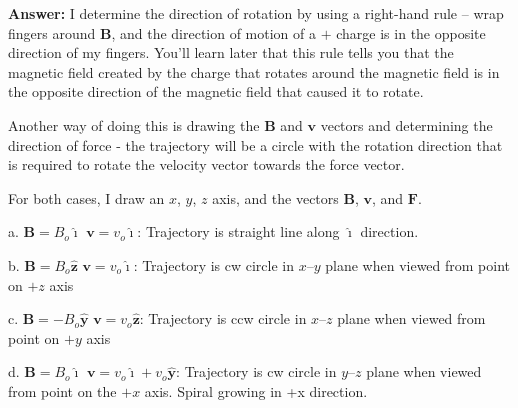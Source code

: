 \documentclass{article}
\newcommand{\ihat}[0]{\hat{\boldsymbol{\imath}}}
\newcommand{\yhat}[0]{\hat{\mathbf{y}}}
\newcommand{\zhat}[0]{\hat{\mathbf{z}}}
\begin{document}
\ifsolutions
{\bf Answer:} I determine the direction of rotation by using a right-hand rule -- wrap fingers around $\mathbf{B}$, and the direction of motion of a $+$ charge is in the opposite direction of my fingers. You'll learn later that this rule tells you that the magnetic field created by the charge that rotates around the magnetic field is in the opposite direction of the magnetic field that caused it to rotate.

Another way of doing this is drawing the $\mathbf{B}$ and $\mathbf{v}$ vectors and determining the direction of force - the trajectory will be a circle with the rotation direction that is required to rotate the velocity vector towards the force vector.

For both cases, I draw an $x$, $y$, $z$ axis, and the vectors $\mathbf{B}$, $\mathbf{v}$, and $\mathbf{F}$.

a. $\mathbf{B} =  B_o\ihat$  $\mathbf{v} = v_o\ihat$: Trajectory is straight line along $\ihat$ direction.

b. $\mathbf{B} =  B_o\zhat$ $\mathbf{v} = v_o\ihat$: Trajectory is cw circle in $x$--$y$ plane when viewed from point on $+z$ axis

c. $\mathbf{B} = -B_o\yhat$ $\mathbf{v} = v_o\zhat$: Trajectory is ccw circle in $x$--$z$ plane when viewed from point on $+y$ axis

d. $\mathbf{B} = B_o\ihat $ $\mathbf{v} = v_o\ihat+v_o\yhat$: Trajectory is cw circle in $y$--$z$ plane when viewed from point on the $+x$ axis. Spiral growing in +x direction.
\end{document}

